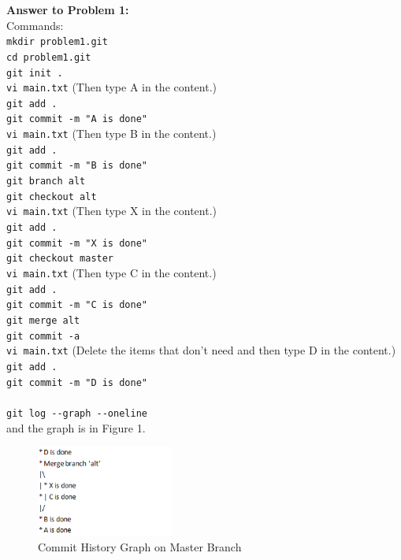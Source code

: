 \documentclass[12pt]{article}
\begin{document}
\bigskip
\noindent\textbf{Answer to Problem 1:}\\
Commands:\\
\verb+mkdir problem1.git+\\
\verb+cd problem1.git+\\
\verb+git init .+\\
\verb+vi main.txt+ (Then type A in the content.)\\
\verb+git add .+\\
\verb+git commit -m "A is done"+\\
\verb+vi main.txt+ (Then type B in the content.)\\
\verb+git add .+\\
\verb+git commit -m "B is done"+\\
\verb+git branch alt+\\
\verb+git checkout alt+\\
\verb+vi main.txt+ (Then type X in the content.)\\
\verb+git add .+\\
\verb+git commit -m "X is done"+\\
\verb+git checkout master+\\
\verb+vi main.txt+ (Then type C in the content.)\\
\verb+git add .+\\
\verb+git commit -m "C is done"+\\
\verb+git merge alt+\\
\verb+git commit -a+\\
\verb+vi main.txt+ (Delete the items that don't need and then type D in the content.)\\
\verb+git add .+\\
\verb+git commit -m "D is done"+\\


\\
\verb+git log --graph --oneline+\\
and the graph is in Figure 1.

\begin{figure}[!htb]
    \begin{center}
        \includegraphics[width=0.4\textwidth]{master.png}
    \end{center}
    \caption{Commit History Graph on Master Branch}
\end{figure}
\end{document}
